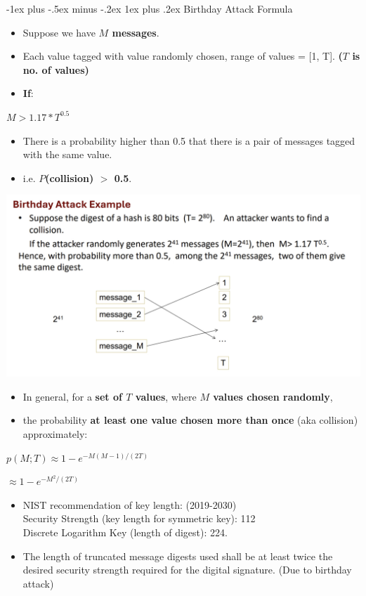 \documentclass[10pt, landscape]{article}
\makeatletter
\renewcommand{\subsubsection}{\@startsection{subsubsection}{3}{0mm}%
                                {-1ex plus -.5ex minus -.2ex}%
                                {1ex plus .2ex}%
                                {\normalfont\small\bfseries}}
\makeatother
\begin{document}
\begin{multicols*}{3}
\subsubsection{Birthday Attack Formula}
\begin{itemize}
\item Suppose we have \textbf{$M$ messages}.
\item Each value tagged with value randomly chosen, range of values = [1, T]. \textbf{($T$ is no. of values)}
\item \textbf{If}:
\end{itemize}
\centerline{$M > 1.17 * T^{0.5}$}
\begin{itemize}
\item There is a probability higher than 0.5 that there is a pair of messages tagged with the same value.
\item i.e. \textbf{$P$(collision) $>$ 0.5}.
\end{itemize}
\centerline{\includegraphics[width=1\linewidth]{birthdayAttack}}
\begin{itemize}
\item In general, for a \textbf{set of $T$ values}, where \textbf{$M$ values chosen randomly},
\item the probability \textbf{at least one value chosen more than once} (aka collision) approximately:
\end{itemize}
\centerline{$ p(M;T)\approx 1-e^{-M(M-1)/(2T)}$}
\smallskip
\centerline{$\approx 1-e^{-M^{2}/(2T)}$}
\begin{itemize}
\item NIST recommendation of key length: (2019-2030) \\
Security Strength (key length for symmetric key): 112 \\
Discrete Logarithm Key (length of digest): 224.
\item The length of truncated message digests used shall be at least twice the desired security
strength required for the digital signature. (Due to birthday attack)
\end{itemize}


\end{multicols*}
\end{document}
